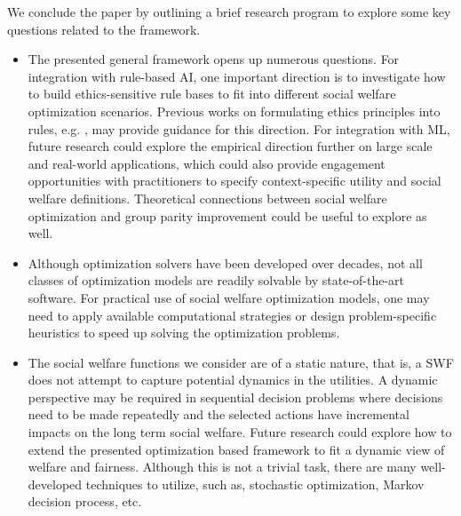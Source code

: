 \documentclass{article}[11pt]
\begin{document}
We conclude the paper by outlining a brief research program to explore some key questions related to the framework. 
\begin{itemize}
    \item The presented general framework opens up numerous questions. For integration with rule-based AI, one important direction is to investigate how to build ethics-sensitive rule bases to fit into different social welfare optimization scenarios. Previous works on formulating ethics principles into rules, e.g. \cite{BriArkBel06,KimHooDon2021}, may provide guidance for this direction. For integration with ML, future research could 
    explore the empirical direction further on large scale and real-world applications, which could also provide engagement opportunities with practitioners to specify context-specific utility and social welfare definitions. Theoretical connections between social welfare optimization and group parity improvement could be useful to explore as well.
    
    \item Although optimization solvers have been developed over decades, not all classes of optimization models are readily solvable by state-of-the-art software. 
    For practical use of social welfare optimization models, one may need to apply available computational strategies or design problem-specific heuristics to speed up solving the optimization problems. 
    
    \item The social welfare functions we consider are of a static nature, that is, a SWF does not attempt to capture potential dynamics in the utilities. 
    A dynamic perspective may be required in sequential decision problems where decisions need to be made repeatedly and the selected actions have incremental impacts on the long term social welfare. Future research could explore how to extend the presented optimization based framework to fit a dynamic view of welfare and fairness. Although this is not a trivial task, there are many well-developed techniques to utilize, such as, stochastic optimization, Markov decision process, etc. 
\end{itemize}


%

\end{document}
